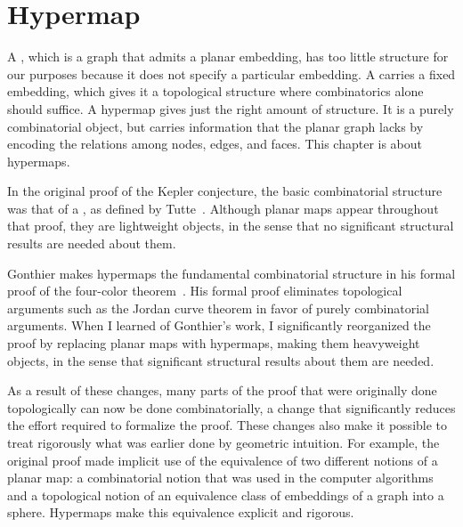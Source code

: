 \chapter{Hypermap}\label{chap:hypermap}
%

\begin{summary}
  A , which is a graph that admits a planar
  embedding, has too little structure for our purposes because it
  does not specify a particular embedding.  A 
  carries a fixed embedding, which gives it a topological structure
  where combinatorics alone should suffice.  A hypermap gives just the
  right amount of structure.  It is a purely combinatorial object, but
  carries information that the planar graph lacks by encoding the
  relations among nodes, edges, and faces.  This chapter is about
  hypermaps.

  In the original proof of the Kepler conjecture, the basic
  combinatorial structure was that of a , as
  defined by Tutte~\cite{Tutte:1984}.  Although
  planar maps appear throughout that proof, they are lightweight
  objects, in the sense that no significant structural results are
  needed about them.

Gonthier makes hypermaps the fundamental combinatorial structure in
his formal proof of the four-color theorem~\cite{gonthier:2008:formal}.  His formal
proof eliminates topological arguments such as the Jordan curve theorem 
in favor of
purely combinatorial arguments.    When I learned of Gonthier's work,
I significantly reorganized the proof by replacing planar maps with
hypermaps, making them heavyweight objects, in the
sense that significant structural results about them are needed.

As a result of these changes, many parts of the proof that were
originally done topologically can now be done combinatorially, a change that
significantly reduces the effort required to formalize the proof.
These changes also make it possible to treat rigorously what was
earlier done by geometric intuition.  For example, the original proof
made implicit use of the equivalence of two different notions of a
planar map: a combinatorial notion that was used in the computer
algorithms and a topological notion of an equivalence class of
embeddings of a graph into a sphere.  Hypermaps make this equivalence
explicit and rigorous.


\end{summary}
